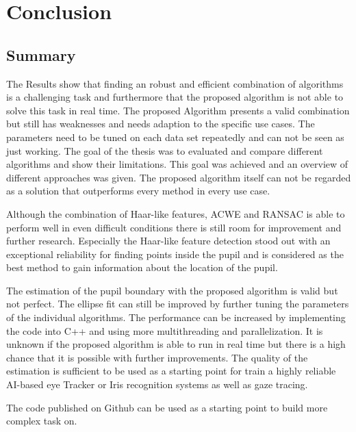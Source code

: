 \chapter{Conclusion}
\label{chap:conclusion}
\section{Summary}
\label{sec:summary}
The Results show that finding an robust and efficient combination of algorithms is a challenging task and furthermore that the proposed algorithm is not able to solve this task in real time. The proposed Algorithm presents a valid combination but still has weaknesses and needs adaption to the specific use cases. The parameters need to be tuned on each data set repeatedly and can not be seen as just working. The goal of the thesis was to evaluated and compare different algorithms and show their limitations. This goal was achieved and an overview of different approaches was given. The proposed algorithm itself can not be regarded as a solution that outperforms every method in every use case.

Although the combination of Haar-like features, ACWE and RANSAC is able to perform well in even difficult conditions there is still room for improvement and further research. Especially the Haar-like feature detection stood out with an exceptional reliability for finding points inside the pupil and is considered as the best method to gain information about the location of the pupil.

The estimation of the pupil boundary with the proposed algorithm is valid but not perfect. The ellipse fit can still be improved by further tuning the parameters of the individual algorithms. The performance can be increased by implementing the code into C++ and using more multithreading and parallelization. It is unknown if the proposed algorithm is able to run in real time but there is a high chance that it is possible with further improvements. The quality of the estimation is sufficient to be used as a starting point for train a highly reliable AI-based eye Tracker or Iris recognition systems as well as gaze tracing.  

The code published on Github can be used as a starting point to build more complex task on.  